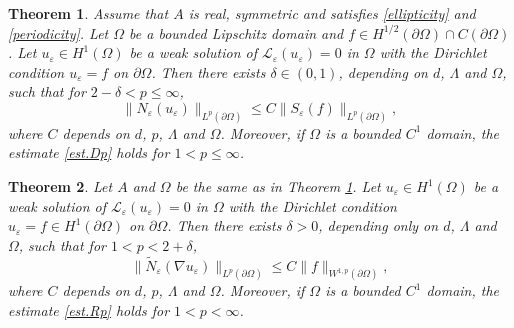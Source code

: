 \documentclass[reqno,12pt]{amsart} %
\newtheorem{theorem}{Theorem}[section]
\theoremstyle{definition}
\theoremstyle{remark}
\numberwithin{equation}{section}
\newcommand{\cL}{\mathcal{L}}
\newcommand{\e}{\varepsilon}
\begin{document}
\begin{theorem}\label{thm.Dp}
Assume that $A$ is real, symmetric and satisfies \eqref{ellipticity} and \eqref{periodicity}.
    Let $\Omega$ be a bounded Lipschitz domain and
    $f\in H^{1/2}(\partial\Omega)\cap C(\partial\Omega)$. Let
     $u_\e\in H^1(\Omega)$  be a weak solution of
     $\cL_\e (u_\e)=0$ in $\Omega$ with the
     Dirichlet condition $u_\e =f$
     on $\partial\Omega$. Then there exists $\delta\in (0, 1)$,
     depending on $d$, $\Lambda$ and $\Omega$,
     such that for $2-\delta < p \le \infty$,
    \begin{equation}\label{est.Dp}
        \| N_\e(u_\e) \|_{L^p(\partial \Omega)} \le C \| S_{\e}(f)\|_{L^p(\partial \Omega)},
    \end{equation}
    where $C$  depends on $d$,  $p$,  $\Lambda$ and $\Omega$.
    Moreover, if $\Omega$ is a bounded $C^1$ domain,
    the estimate \eqref{est.Dp} holds for $1< p\le \infty$.
\end{theorem}



\begin{theorem}\label{thm.Rp}
Let $A$ and $\Omega$ be the same as in Theorem \ref{thm.Dp}.
     Let $u_\e\in H^1(\Omega)$ be a weak solution of $\cL_\e (u_\e)=0$ in $\Omega$
     with the Dirichlet condition $u_\e=f\in H^1(\partial\Omega)$
     on $\partial\Omega$. Then there exists $\delta>0$, depending only on $d$,  $\Lambda$ and $\Omega$, such that for $1<p<2+\delta$,
    \begin{equation}\label{est.Rp}
        \| \widetilde{N}_\e( \nabla u_\e) \|_{L^p(\partial \Omega)} 
        \le C\| f \|_{W^{1,p}(\partial \Omega)},
    \end{equation}
    where $C$ depends on $d$, $p$,  $\Lambda$ and $\Omega$.
    Moreover, if $\Omega$ is a bounded $C^1$ domain,
    the estimate \eqref{est.Rp} holds for $1< p< \infty$.
\end{theorem}
\end{document}
